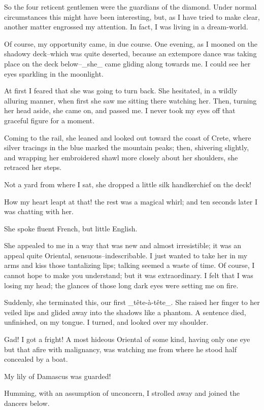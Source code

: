 So the four reticent gentlemen were the guardians of the diamond.
Under normal circumstances this might have been interesting, but, as
I have tried to make clear, another matter engrossed my attention. In
fact, I was living in a dream-world.

Of course, my opportunity came, in due course. One evening, as I
mooned on the shadowy deck--which was quite deserted, because an
extempore dance was taking place on the deck below--_she_ came gliding
along towards me. I could see her eyes sparkling in the moonlight.

At first I feared that she was going to turn back. She hesitated, in
a wildly alluring manner, when first she saw me sitting there watching
her. Then, turning her head aside, she came on, and passed me. I never
took my eyes off that graceful figure for a moment.

Coming to the rail, she leaned and looked out toward the coast of
Crete, where silver tracings in the blue marked the mountain peaks;
then, shivering slightly, and wrapping her embroidered shawl more
closely about her shoulders, she retraced her steps.

Not a yard from where I sat, she dropped a little silk handkerchief
on the deck!

How my heart leapt at that! the rest was a magical whirl; and ten
seconds later I was chatting with her.

She spoke fluent French, but little English.

She appealed to me in a way that was new and almost irresistible; it
was an appeal quite Oriental, sensuous--indescribable. I just wanted
to take her in my arms and kiss those tantalizing lips; talking seemed
a waste of time. Of course, I cannot hope to make you understand; but
it was extraordinary. I felt that I was losing my head; the glances of
those long dark eyes were setting me on fire.

Suddenly, she terminated this, our first _tête-à-tête_. She raised her
finger to her veiled lips and glided away into the shadows like a
phantom. A sentence died, unfinished, on my tongue. I turned, and
looked over my shoulder.

Gad! I got a fright! A most hideous Oriental of some kind, having only
one eye but that afire with malignancy, was watching me from where he
stood half concealed by a boat.

My lily of Damascus was guarded!

Humming, with an assumption of unconcern, I strolled away and joined
the dancers below.


